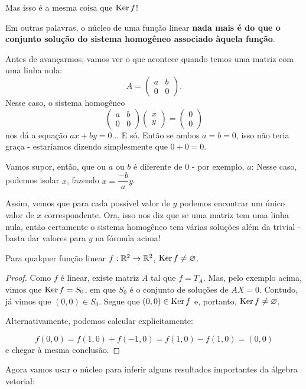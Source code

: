 \begin{ex}
	Mas isso é a mesma coisa que $\operatorname{Ker} f$!
	
	Em outras palavras, o núcleo de uma função linear \textbf{nada mais é do que o conjunto solução do sistema homogêneo associado àquela função}.
	
	\tcblower
	Antes de avançarmos, vamos ver o que acontece quando temos uma matriz com uma linha nula:
	\[A=\begin{pmatrix}
	a&b\\0&0
	\end{pmatrix}.\] Nesse caso, o sistema homogêneo
	\[\begin{pmatrix}
	a&b\\0&0
	\end{pmatrix}\begin{pmatrix}
	x\\y
	\end{pmatrix}=\begin{pmatrix}
	0\\0
	\end{pmatrix}\]nos dá a equação $ax+by=0$... E só. Então se ambos $a=b=0$, isso não teria graça - estaríamos dizendo simplesmente que $0+0=0$.
	
	Vamos supor, então, que ou $a$ ou $b$ é diferente de 0 - por exemplo, $a$: Nesse caso, podemos isolar $x$, fazendo $x=\dfrac{-b}{a}y$.
	
	Assim, vemos que para cada possível valor de $y$ podemos encontrar um único valor de $x$ correspondente. Ora, isso nos diz que se uma matriz tem uma linha nula, então certamente o sistema homogêneo tem várias soluções além da trivial - basta dar valores para $y$ na fórmula acima!
\end{ex}

\begin{prop}
	Para qualquer função linear $f:\mathbb R^2\to\mathbb R^2$, $\operatorname{Ker} f\neq \varnothing$.
\end{prop}
\begin{proof}
	Como $f$ é linear, existe matriz $A$ tal que $f=T_A$. Mas, pelo exemplo acima, vimos que $\operatorname{Ker} f= S_0$, em que $S_0$ é o conjunto de soluções de $AX=0$. Contudo, já vimos que $(0,0)\in S_0$. Segue que $(0,0)\in \operatorname{Ker} f$ e, portanto, $\operatorname{Ker} f\neq\varnothing$.
	
	
	Alternativamente, podemos calcular explicitamente:
	
	\[f(0,0)=f(1,0)+f(-1,0)=f(1,0)-f(1,0)=(0,0)\]e chegar à mesma conclusão.
\end{proof}

Agora vamos usar o núcleo para inferir alguns resultados importantes da álgebra vetorial:

